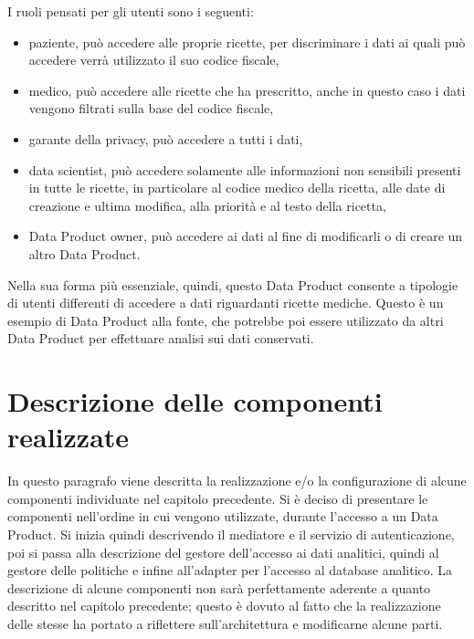 \documentclass[a4paper,12pt]{report}
\begin{document}
I ruoli pensati per gli utenti sono i seguenti:
\begin{itemize}
    \item paziente, può accedere alle proprie ricette, per discriminare i dati ai quali può accedere verrà utilizzato il suo codice fiscale,
    \item medico, può accedere alle ricette che ha prescritto, anche in questo caso i dati vengono filtrati sulla base del codice fiscale,
    \item garante della privacy, può accedere a tutti i dati,
    \item data scientist, può accedere solamente alle informazioni non sensibili presenti in tutte le ricette, in particolare al codice medico della ricetta, alle date  di creazione e ultima modifica, alla priorità e al testo della ricetta,  
    \item Data Product owner, può accedere ai dati al fine di modificarli o di creare un altro Data Product.
\end{itemize}
Nella sua forma più essenziale, quindi, questo Data Product consente a tipologie di utenti differenti di accedere a dati riguardanti ricette mediche.
Questo è un esempio di Data Product alla fonte, che potrebbe poi essere utilizzato da altri Data Product per effettuare analisi sui dati conservati.

\section{Descrizione delle componenti realizzate}
In questo paragrafo viene descritta la realizzazione e/o la configurazione di alcune componenti individuate nel capitolo precedente.
Si è deciso di presentare le componenti nell'ordine in cui vengono utilizzate, durante l'accesso a un Data Product.
Si inizia quindi descrivendo il mediatore e il servizio di autenticazione, poi si passa alla descrizione del gestore dell'accesso ai dati analitici, quindi al gestore delle politiche e infine all'adapter per l'accesso al database analitico.
La descrizione di alcune componenti non sarà perfettamente aderente a quanto descritto nel capitolo precedente; questo è dovuto al fatto che la realizzazione delle stesse ha portato a riflettere sull'architettura e modificarne alcune parti.
\end{document}
